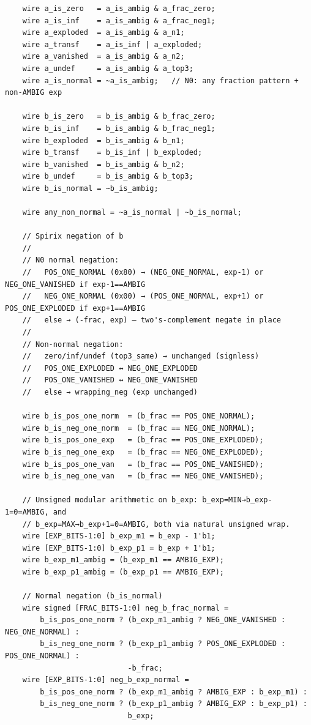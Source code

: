 \documentclass[12pt,letter]{article}
\begin{document}
\begin{lstlisting}
    wire a_is_zero   = a_is_ambig & a_frac_zero;
    wire a_is_inf    = a_is_ambig & a_frac_neg1;
    wire a_exploded  = a_is_ambig & a_n1;
    wire a_transf    = a_is_inf | a_exploded;
    wire a_vanished  = a_is_ambig & a_n2;
    wire a_undef     = a_is_ambig & a_top3;
    wire a_is_normal = ~a_is_ambig;   // N0: any fraction pattern + non-AMBIG exp

    wire b_is_zero   = b_is_ambig & b_frac_zero;
    wire b_is_inf    = b_is_ambig & b_frac_neg1;
    wire b_exploded  = b_is_ambig & b_n1;
    wire b_transf    = b_is_inf | b_exploded;
    wire b_vanished  = b_is_ambig & b_n2;
    wire b_undef     = b_is_ambig & b_top3;
    wire b_is_normal = ~b_is_ambig;

    wire any_non_normal = ~a_is_normal | ~b_is_normal;

    // Spirix negation of b
    //
    // N0 normal negation:
    //   POS_ONE_NORMAL (0x80) → (NEG_ONE_NORMAL, exp-1) or NEG_ONE_VANISHED if exp-1==AMBIG
    //   NEG_ONE_NORMAL (0x00) → (POS_ONE_NORMAL, exp+1) or POS_ONE_EXPLODED if exp+1==AMBIG
    //   else → (-frac, exp) — two's-complement negate in place
    //
    // Non-normal negation:
    //   zero/inf/undef (top3_same) → unchanged (signless)
    //   POS_ONE_EXPLODED ↔ NEG_ONE_EXPLODED
    //   POS_ONE_VANISHED ↔ NEG_ONE_VANISHED
    //   else → wrapping_neg (exp unchanged)

    wire b_is_pos_one_norm  = (b_frac == POS_ONE_NORMAL);
    wire b_is_neg_one_norm  = (b_frac == NEG_ONE_NORMAL);
    wire b_is_pos_one_exp   = (b_frac == POS_ONE_EXPLODED);
    wire b_is_neg_one_exp   = (b_frac == NEG_ONE_EXPLODED);
    wire b_is_pos_one_van   = (b_frac == POS_ONE_VANISHED);
    wire b_is_neg_one_van   = (b_frac == NEG_ONE_VANISHED);

    // Unsigned modular arithmetic on b_exp: b_exp=MIN→b_exp-1=0=AMBIG, and
    // b_exp=MAX→b_exp+1=0=AMBIG, both via natural unsigned wrap.
    wire [EXP_BITS-1:0] b_exp_m1 = b_exp - 1'b1;
    wire [EXP_BITS-1:0] b_exp_p1 = b_exp + 1'b1;
    wire b_exp_m1_ambig = (b_exp_m1 == AMBIG_EXP);
    wire b_exp_p1_ambig = (b_exp_p1 == AMBIG_EXP);

    // Normal negation (b_is_normal)
    wire signed [FRAC_BITS-1:0] neg_b_frac_normal =
        b_is_pos_one_norm ? (b_exp_m1_ambig ? NEG_ONE_VANISHED : NEG_ONE_NORMAL) :
        b_is_neg_one_norm ? (b_exp_p1_ambig ? POS_ONE_EXPLODED : POS_ONE_NORMAL) :
                            -b_frac;
    wire [EXP_BITS-1:0] neg_b_exp_normal =
        b_is_pos_one_norm ? (b_exp_m1_ambig ? AMBIG_EXP : b_exp_m1) :
        b_is_neg_one_norm ? (b_exp_p1_ambig ? AMBIG_EXP : b_exp_p1) :
                            b_exp;


\end{lstlisting}
\end{document}
